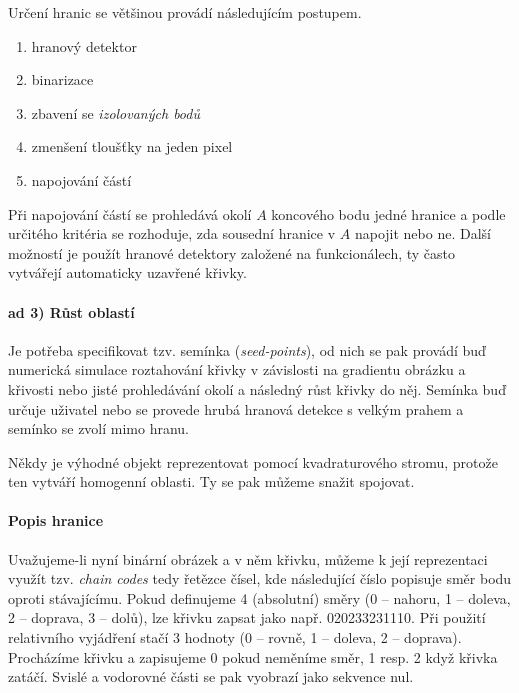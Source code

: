Určení hranic se většinou provádí následujícím postupem.

\begin{enumerate}
\item hranový detektor
\item binarizace
\item zbavení se {\em izolovaných bodů}
\item zmenšení tloušťky na jeden pixel
\item napojování částí
\end{enumerate}

Při napojování částí se prohledává okolí $A$ koncového bodu jedné hranice a podle určitého kritéria se
rozhoduje, zda sousední hranice v $A$ napojit nebo ne. Další možností je  použít
hranové detektory založené na funkcionálech, ty často vytvářejí automaticky uzavřené křivky.


\paragraph{ad 3) Růst oblastí}
Je potřeba specifikovat tzv. semínka ({\em seed-points}), od nich se pak provádí buď numerická simulace roztahování
křivky v závislosti na gradientu obrázku a křivosti nebo jisté prohledávání okolí a následný růst křivky do něj.
Semínka buď určuje uživatel nebo se provede hrubá hranová detekce s velkým prahem a semínko se zvolí mimo hranu.

Někdy je výhodné objekt reprezentovat pomocí kvadraturového stromu, protože ten vytváří
homogenní oblasti. Ty se pak můžeme snažit spojovat.

\paragraph{Popis hranice}
Uvažujeme-li nyní binární obrázek a v něm křivku, můžeme k její reprezentaci využít tzv. {\em chain codes} tedy
řetězce čísel, kde následující číslo popisuje směr bodu oproti stávajícímu. Pokud definujeme 4 (absolutní) směry
(0 -- nahoru, 1 -- doleva, 2 -- doprava, 3 -- dolů), lze křivku zapsat jako např. 020233231110. Při použití 
relativního vyjádření stačí 3 hodnoty (0 -- rovně, 1 -- doleva, 2 -- doprava). Procházíme křivku a zapisujeme
0 pokud neměníme směr, 1 resp. 2 když křivka zatáčí. Svislé a vodorovné části se pak vyobrazí jako sekvence nul.

